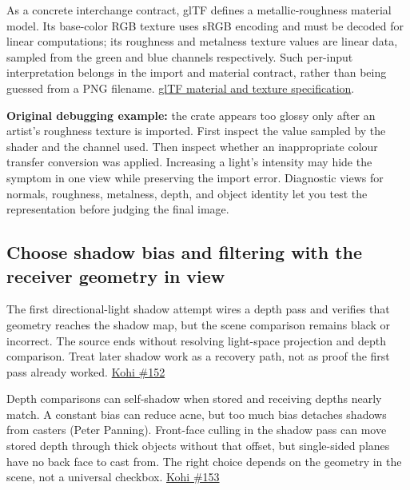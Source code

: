 As a concrete interchange contract, glTF defines a metallic-roughness material model. Its base-color RGB texture uses sRGB encoding and must be decoded for linear computations; its roughness and metalness texture values are linear data, sampled from the green and blue channels respectively. Such per-input interpretation belongs in the import and material contract, rather than being guessed from a PNG filename. \href{https://registry.khronos.org/glTF/specs/2.0/glTF-2.0.html\#materials}{glTF material and texture specification}.

\textbf{Original debugging example:} the crate appears too glossy only after an artist's roughness texture is imported. First inspect the value sampled by the shader and the channel used. Then inspect whether an inappropriate colour transfer conversion was applied. Increasing a light's intensity may hide the symptom in one view while preserving the import error. Diagnostic views for normals, roughness, metalness, depth, and object identity let you test the representation before judging the final image.

\subsection{Choose shadow bias and filtering with the receiver geometry in view}\label{06-engine-ii-ch026-choose-shadow-bias-and-filtering-with-the-receiver-geometry-in-view}

\hypertarget{06-engine-ii-ch026-choose-shadow-bias-and-filtering-with-the-receiver-geometry-in-view}{}

The first directional-light shadow attempt wires a depth pass and verifies that geometry reaches the shadow map, but the scene comparison remains black or incorrect. The source ends without resolving light-space projection and depth comparison. Treat later shadow work as a recovery path, not as proof the first pass already worked. \href{https://www.youtube.com/watch?v=2IxH8C9OUzg}{Kohi \#152}

Depth comparisons can self-shadow when stored and receiving depths nearly match. A constant bias can reduce acne, but too much bias detaches shadows from casters (Peter Panning). Front-face culling in the shadow pass can move stored depth through thick objects without that offset, but single-sided planes have no back face to cast from. The right choice depends on the geometry in the scene, not a universal checkbox. \href{https://www.youtube.com/watch?v=32RYiLA3OBs}{Kohi \#153}

